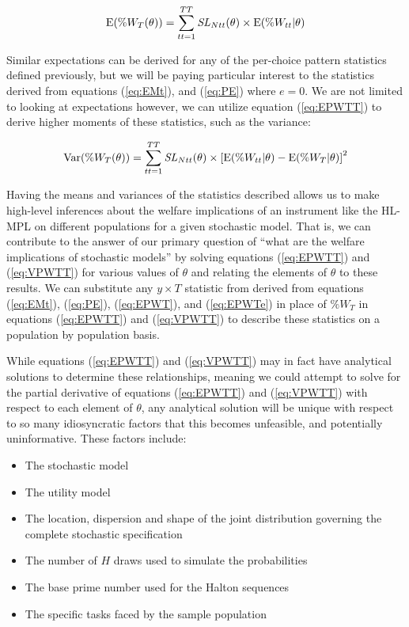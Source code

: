 \documentclass[../main.tex]{subfiles}
\begin{document}
\begin{equation}
	\label{eq:EPWTT}
	\operatorname{E}(\%W_T(\theta)) = \sum_{tt=1}^{TT} \mathit{SL}_{Ntt}(\theta) \times \operatorname{E}(\%W_{tt} | \theta)
\end{equation}

Similar expectations can be derived for any of the per-choice pattern statistics defined previously, but we will be paying particular interest to the statistics derived from equations (\ref{eq:EMt}), and (\ref{eq:PE}) where $e=0$.
We are not limited to looking at expectations however, we can utilize equation (\ref{eq:EPWTT}) to derive higher moments of these statistics, such as the variance:

\begin{equation}
	\label{eq:VPWTT}
	\operatorname{Var}(\%W_T(\theta)) = \sum_{tt=1}^{TT} \mathit{SL}_{Ntt}(\theta) \times \left[ \operatorname{E}(\%W_{tt} | \theta) - \operatorname{E}(\%W_T | \theta) \right]^2
\end{equation}

Having the means and variances of the statistics described allows us to make high-level inferences about the welfare implications of an instrument like the HL-MPL on different populations for a given stochastic model.
That is, we can contribute to the answer of our primary question of \enquote{what are the welfare implications of stochastic models} by solving equations (\ref{eq:EPWTT}) and (\ref{eq:VPWTT}) for various values of $\theta$ and relating the elements of $\theta$ to these results.
We can substitute any  $y \times T$ statistic from derived from equations (\ref{eq:EMt}), (\ref{eq:PE}), (\ref{eq:EPWT}), and (\ref{eq:EPWTe}) in place of $\%W_T$ in equations (\ref{eq:EPWTT}) and (\ref{eq:VPWTT}) to describe these statistics on a population by population basis.

While equations (\ref{eq:EPWTT}) and (\ref{eq:VPWTT}) may in fact have analytical solutions to determine these relationships, meaning we could attempt to solve for the partial derivative of equations (\ref{eq:EPWTT}) and (\ref{eq:VPWTT}) with respect to each element of $\theta$, any analytical solution will be unique with respect to so many idiosyncratic factors that this becomes unfeasible, and potentially uninformative.
These factors include:
\begin{itemize}
 \setlength\itemsep{-.25em}
	\item The stochastic model
	\item The utility model
	\item The location, dispersion and shape of the joint distribution governing the complete stochastic specification
	\item The number of $H$ draws used to simulate the probabilities
	\item The base prime number used for the Halton sequences
	\item The specific tasks faced by the sample population
\end{itemize}
\end{document}
